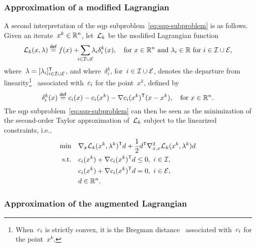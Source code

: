 \subsubsection{Approximation of a modified Lagrangian}

A second interpretation of the \gls{sqp} subproblem~\cref{eq:sqp-subproblem} is as follows.
Given an iterate~$x^k \in \mathbb{R}^n$, let~$\lag[k]$ be the modified Lagrangian function
\begin{equation*}
    \lag[k](x, \lambda) \eqdef \obj(x) + \sum_{\mathclap{i \in \iub \cup \ieq}} \lambda_i \delta_i^k(x), \quad \text{for~$x \in \R^n$ and~$\lambda_i \in \R$ for~$i \in \iub \cup \ieq$},
\end{equation*}
where~$\lambda = [\lambda_i]_{i \in \mathcal{I} \cup \mathcal{E}}^{\mathsf{T}}$, and where~$\delta_i^k$, for~$i \in \mathcal{I} \cup \mathcal{E}$, denotes the departure from linearity\footnote{When~$c_{i}$ is strictly convex, it is the Bregman distance~\cite{Bregman_1967} associated with~$c_{i}$ for the point~$x^k$.}~\cite{Robinson_1972,Hoek_1982} associated with~$c_{i}$ for the point~$x^k$, defined by
\begin{equation*}
    \delta_i^k(x) \mathrel{\stackrel{\mathsf{def}}{=}} c_{i}(x) - c_{i}(x^k) - \nabla c_{i}(x^k)^{\mathsf{T}} (x - x^k), \quad \text{for~$x \in \mathbb{R}^n$.}
\end{equation*}
The \gls{sqp} subproblem~\cref{eq:sqp-subproblem} can then be seen as the minimization of the second-order Taylor approximation of~$\lag[k]$ subject to the linearized constraints, i.e.,
\begin{align}
    \min        & \quad \nabla_x \lag[k](x^k, \lambda^k)^{\T} d + \frac{1}{2} d^{\T} \nabla_{x, x}^2 \lag[k](x^k, \lambda^k) d\\
    \text{s.t.} & \quad \con{i}(x^k) + \nabla \con{i}(x^k)^{\T} d \le 0, ~ i \in \iub,\\
                & \quad \con{i}(x^k) + \nabla \con{i}(x^k)^{\T} d = 0, ~ i \in \ieq,\\
                & \quad d \in \R^n.
\end{align}

\subsubsection{Approximation of the augmented Lagrangian}

